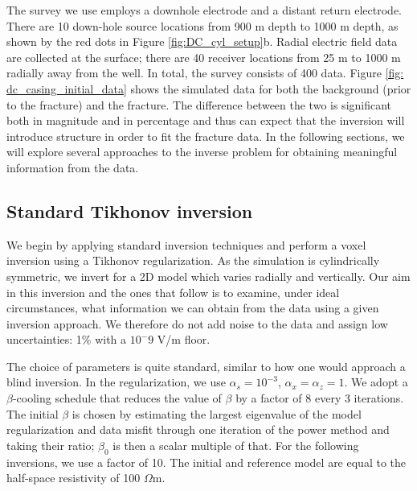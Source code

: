 

The survey we use employs a downhole electrode and a distant return electrode. There are 10 down-hole source locations from 900 m depth to 1000 m depth, as shown by the red dots in Figure \ref{fig:DC_cyl_setup}b. Radial electric field data are collected at the surface; there are 40 receiver locations from 25 m to 1000 m radially away from the well. In total, the survey consists of 400 data. Figure \ref{fig: dc_casing_initial_data} shows the simulated data for both the background (prior to the fracture) and the fracture. The difference between the two is significant both in magnitude and in percentage and thus can expect that the inversion will introduce structure in order to fit the fracture data. In the following sections, we will explore several approaches to the inverse problem for obtaining meaningful information from the data.




\subsection{Standard Tikhonov inversion}
We begin by applying standard inversion techniques and perform a voxel inversion using a Tikhonov regularization. As the simulation is cylindrically symmetric, we invert for a 2D model which varies radially and vertically. Our aim in this inversion and the ones that follow is to examine, under ideal circumstances, what information we can obtain from the data using a given inversion approach. We therefore do not add noise to the data and assign low uncertainties: 1\% with a $10^-9$ V/m floor.

The choice of parameters is quite standard, similar to how one would approach a blind inversion. In the regularization, we use $\alpha_s = 10^{-3}$, $\alpha_x = \alpha_z = 1$. We adopt a $\beta$-cooling schedule that reduces the value of $\beta$ by a factor of 8 every 3 iterations. The initial $\beta$ is chosen by estimating the largest eigenvalue of the  model regularization and data misfit through one iteration of the power method and taking their ratio; $\beta_0$ is then a scalar multiple of that. For the following inversions, we use a factor of 10. The initial and reference model are equal to the half-space resistivity of 100 $\Omega$m.

